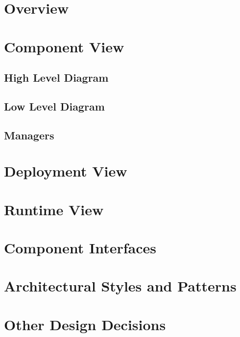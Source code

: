 \section{Overview}
\section{Component View}
\subsection{High Level Diagram}
\subsection{Low Level Diagram}
\subsection{Managers}
\section{Deployment View}
\section{Runtime View}
\section{Component Interfaces}
\section{Architectural Styles and Patterns}
\section{Other Design Decisions}
